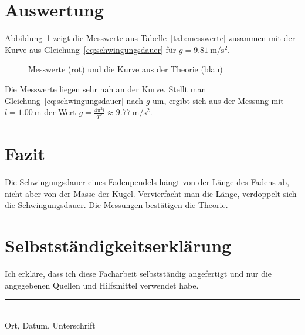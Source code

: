 \documentclass[12pt,a4paper]{article}
\begin{document}
\section{Auswertung}

Abbildung~\ref{fig:diagramm} zeigt die Messwerte aus Tabelle~\ref{tab:messwerte}
zusammen mit der Kurve aus Gleichung~\eqref{eq:schwingungsdauer} für
$g = \qty{9,81}{\metre\per\second\squared}$.

\begin{figure}[H]
  \centering
  \caption{Messwerte (rot) und die Kurve aus der Theorie (blau)}
  \label{fig:diagramm}
\end{figure}

Die Messwerte liegen sehr nah an der Kurve. Stellt man
Gleichung~\eqref{eq:schwingungsdauer} nach $g$ um, ergibt sich aus der Messung
mit $l = \qty{1,00}{\metre}$ der Wert $g = \frac{4\pi^2 l}{T^2}
\approx \qty{9,77}{\metre\per\second\squared}$.

\section{Fazit}

Die Schwingungsdauer eines Fadenpendels hängt von der Länge des Fadens ab,
nicht aber von der Masse der Kugel. Vervierfacht man die Länge, verdoppelt
sich die Schwingungsdauer. Die Messungen bestätigen die Theorie.

\printbibliography

\newpage
\section*{Selbstständigkeitserklärung}

Ich erkläre, dass ich diese Facharbeit selbstständig angefertigt und nur die
angegebenen Quellen und Hilfsmittel verwendet habe.

\vspace{20mm}
\rule{60mm}{0.4pt}\\
Ort, Datum, Unterschrift
\end{document}
